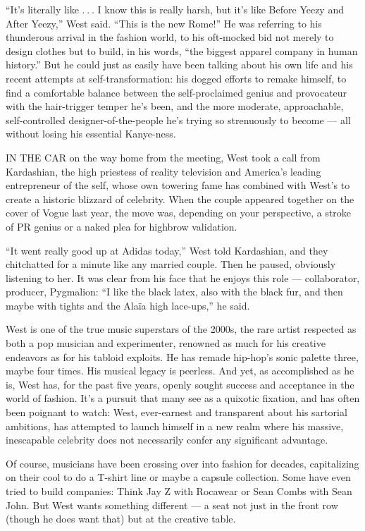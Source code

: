 ``It's literally like . . . I know this is really harsh, but it's like
Before Yeezy and After Yeezy,'' West said. ``This is the new Rome!'' He
was referring to his thunderous arrival in the fashion world, to his
oft-mocked bid not merely to design clothes but to build, in his words,
``the biggest apparel company in human history.'' But he could just as
easily have been talking about his own life and his recent attempts at
self-transformation: his dogged efforts to remake himself, to find a
comfortable balance between the self-proclaimed genius and provocateur
with the hair-trigger temper he's been, and the more moderate,
approachable, self-controlled designer-of-the-people he's trying so
strenuously to become --- all without losing his essential Kanye-ness.

IN THE CAR on the way home from the meeting, West took a call from
Kardashian, the high priestess of reality television and America's
leading entrepreneur of the self, whose own towering fame has combined
with West's to create a historic blizzard of celebrity. When the couple
appeared together on the cover of Vogue last year, the move was,
depending on your perspective, a stroke of PR genius or a naked plea for
highbrow validation.

``It went really good up at Adidas today,'' West told Kardashian, and
they chitchatted for a minute like any married couple. Then he paused,
obviously listening to her. It was clear from his face that he enjoys
this role --- collaborator, producer, Pygmalion: ``I like the black
latex, also with the black fur, and then maybe with tights and the Alaïa
high lace-ups,'' he said.

West is one of the true music superstars of the 2000s, the rare artist
respected as both a pop musician and experimenter, renowned as much for
his creative endeavors as for his tabloid exploits. He has remade
hip-hop's sonic palette three, maybe four times. His musical legacy is
peerless. And yet, as accomplished as he is, West has, for the past five
years, openly sought success and acceptance in the world of fashion.
It's a pursuit that many see as a quixotic fixation, and has often been
poignant to watch: West, ever-earnest and transparent about his
sartorial ambitions, has attempted to launch himself in a new realm
where his massive, inescapable celebrity does not necessarily confer any
significant advantage.

Of course, musicians have been crossing over into fashion for decades,
capitalizing on their cool to do a T-shirt line or maybe a capsule
collection. Some have even tried to build companies: Think Jay Z with
Rocawear or Sean Combs with Sean John. But West wants something
different --- a seat not just in the front row (though he does want
that) but at the creative table.

